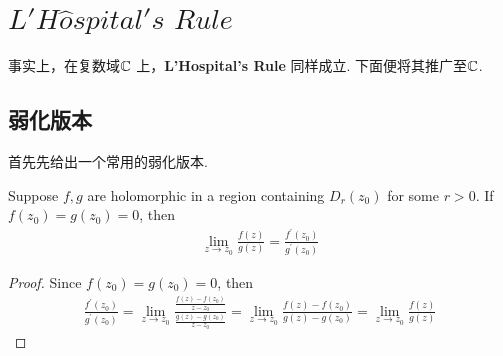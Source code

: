 \appendix
\chapter{$L'H\hat{o}spital's \,\, Rule$}
	事实上，在复数域$\mathbb{C}$ 上，\textbf{L'Hospital's Rule} 同样成立. 下面便将其推广至$\mathbb{C}$.
	
\section{弱化版本}
	首先先给出一个常用的弱化版本.
	\begin{thm}\label{thm A.1.1}
		Suppose $f , g$ are holomorphic in a region containing $D_{r}(z_0)$ for some $r > 0$. If $f(z_0) = g(z_0) = 0$, then
		\begin{align}
			\lim_{z \to z_0}{\frac{f(z)}{g(z)}} = \frac{f^{'}(z_0)}{g^{'}(z_0)}
		\end{align}
	
		\vspace{2em}
		\begin{proof}
			Since $f(z_0) = g(z_0) = 0$, then
			\begin{align}
				\frac{f^{'}(z_0)}{g^{'}(z_0)}
				= \lim_{z \to z_0}{\frac{\frac{f(z) - f(z_0)}{z - z_0}}{\frac{g(z) - g(z_0)}{z - z_0}}}
				= \lim_{z \to z_0}{\frac{f(z) - f(z_0)}{g(z) - g(z_0)}}
				= \lim_{z \to z_0}{\frac{f(z)}{g(z)}}
			\end{align}
		\end{proof}
	\end{thm}






	\ifx\allfiles\undefined

\fi